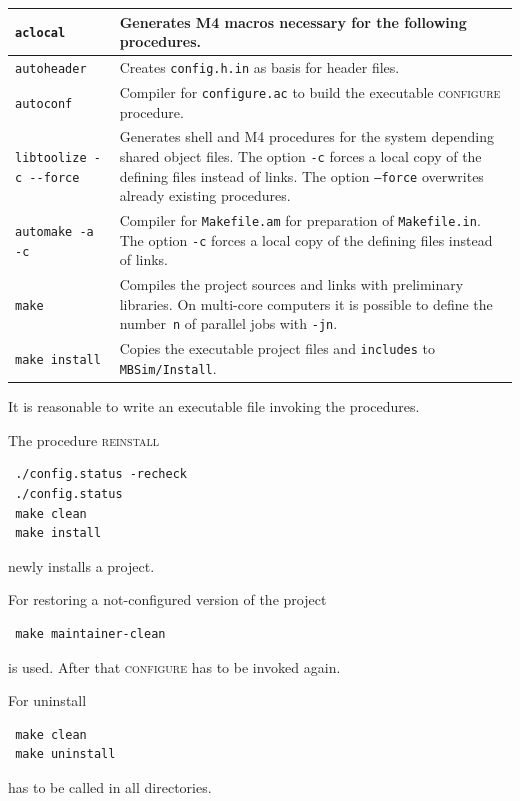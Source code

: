 	\begin{tabular}{|l|p{100mm}|}
	\hline
		\texttt{aclocal} & Generates M4 macros necessary for the following procedures.\\\hline
		\texttt{autoheader} & Creates \texttt{config.h.in} as basis for header files.\\\hline
		\texttt{autoconf} & Compiler for \texttt{configure.ac} to build the executable \textsc{configure} procedure.\\\hline
		\verb|libtoolize -c --force| & Generates shell and M4 procedures for the system depending shared object files. The option \texttt{-c} forces a local copy of the defining files instead of links. The option \texttt{--force} overwrites already existing procedures.\\\hline
		\texttt{automake -a -c} & Compiler for \texttt{Makefile.am} for preparation of \texttt{Makefile.in}. The option \texttt{-c} forces a local copy of the defining files instead of links.\\\hline
		\texttt{make} & Compiles the project sources and links with preliminary libraries. On multi-core computers it is possible to define the number~\texttt{n} of parallel jobs with \texttt{-jn}.\\\hline
		\texttt{make install} & Copies the executable project files and \texttt{includes} to \texttt{MBSim/Install}.\\\hline 
	\end{tabular}
\par It is reasonable to write an executable file invoking the procedures.\\
\par The procedure \textsc{reinstall}
\begin{verbatim}
 ./config.status -recheck
 ./config.status
 make clean
 make install
\end{verbatim}
newly installs a project.\par
For restoring a not-configured version of the project
\begin{verbatim}
 make maintainer-clean
\end{verbatim}
is used. After that \textsc{configure} has to be invoked again.\par 
For uninstall
\begin{verbatim}
 make clean
 make uninstall
\end{verbatim}
has to be called in all directories.

